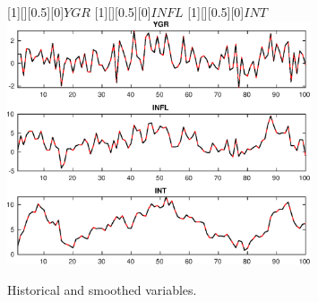  
\begin{figure}[H]
[1][][0.5][0]{$ {YGR} $}
[1][][0.5][0]{$ {INFL} $}
[1][][0.5][0]{$ {INT} $}
\centering 
\includegraphics[width=0.80\textwidth]{AnSchoModTheBuilder_HistoricalAndSmoothedVariables1}
\caption{Historical and smoothed variables.}\label{Fig:HistoricalAndSmoothedVariables:1}
\end{figure}


